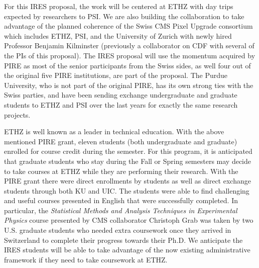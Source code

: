 For this IRES proposal, the work will be centered at ETHZ with day
trips expected by researchers to PSI. We are also building the
collaboration to take advantage of the planned coherence of the Swiss
CMS Pixel Upgrade consortium which includes ETHZ, PSI, and the
University of Zurich with newly hired Professor Benjamin Kilminster
(previously a collaborator on CDF with several of the PIs of this
proposal). The IRES proposal will use the momentum acquired by PIRE as
most of the senior participants from the Swiss sides, as well four out
of the original five PIRE institutions, are part of the proposal. The
Purdue University, who is not part of the original PIRE, has its own
strong ties with the Swiss parties, and have been sending exchange
undergraduate and graduate students to ETHZ and PSI over the last
years for exactly the same research projects.

ETHZ is well known as a leader in technical education.  With the above
mentioned PIRE grant, eleven students (both undergraduate and
graduate) enrolled for course credit during the semester.  For this
program, it is anticipated that graduate students who stay during the
Fall or Spring semesters may decide to take courses at ETHZ while they
are performing their research.  With the PIRE grant there were direct
enrollments by students as well as direct exchange students through
both KU and UIC.  The students were able to find challenging and
useful courses presented in English that were successfully completed.
In particular, the {\it Statistical Methods and Analysis Techniques in
  Experimental Physics} course presented by CMS collaborator Christoph
Grab was taken by two U.S. graduate students who needed extra
coursework once they arrived in Switzerland to complete their progress
towards their Ph.D.  We anticipate the IRES students will be able to
take advantage of the now existing administrative framework if they
need to take coursework at ETHZ.
